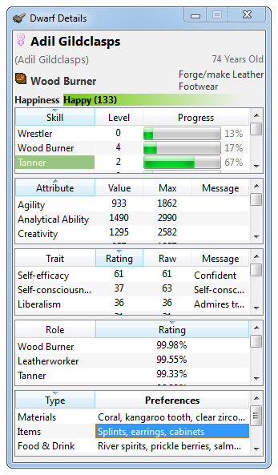 \documentclass[]{article}
\begin{document}
\begin{figure}[h!]
        \centering
        \begin{subfigure}[C]{0.45\linewidth}
                \centering
                \includegraphics[width=.75\textwidth]{Sec1Fig16-1}
        \end{subfigure}~
        \begin{subfigure}[C]{0.45\linewidth}
                \centering

\end{subfigure}
\end{figure}
\end{document}
